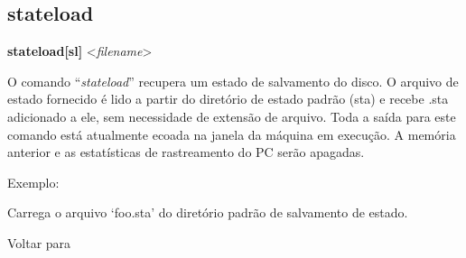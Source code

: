\documentclass[letterpaper,10pt,brazil]{sphinxmanual}
\begin{document}
\subsection{stateload}
\label{debugger/general:stateload}\label{debugger/general:debugger-command-stateload}
\begin{DUlineblock}{0em}
\item[]
\begin{DUlineblock}{\DUlineblockindent}
\item[] \textbf{stateload{[}sl{]}} \textless{}\emph{filename}\textgreater{}
\item[] 
\end{DUlineblock}
\item[] O comando ``\emph{stateload}'' recupera um estado de salvamento do disco. O arquivo de estado fornecido é lido a partir do diretório de estado padrão (sta) e recebe .sta adicionado a ele, sem necessidade de extensão de arquivo. Toda a saída para este comando está atualmente ecoada na janela da máquina em execução. A memória anterior e as estatísticas de rastreamento do PC serão apagadas.
\item[] 
\item[] Exemplo:
\item[] 
\item[]
\begin{DUlineblock}{\DUlineblockindent}
\item[] 
\item[] 
\end{DUlineblock}
\item[] Carrega o arquivo `foo.sta' do diretório padrão de salvamento de estado.
\item[] 
\item[] Voltar para {\hyperref[debugger/general:debugger\string-general\string-list]{}}
\end{DUlineblock}
\begin{quote}
\label{debugger/general:debugger-command-snap}\end{quote}
\end{document}
